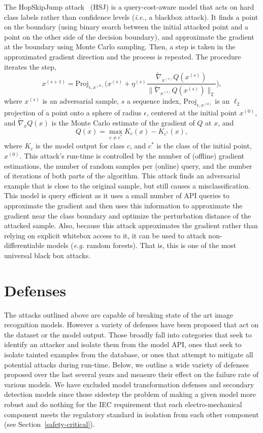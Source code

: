 \documentclass[lettersize,journal]{IEEEtran}
\newcommand{\ie}{\textit{i.e.}\xspace}
\newcommand{\eg}{\textit{e.g.}\xspace}
\begin{document}
The HopSkipJump attack~\cite{hopskipjump} (HSJ) is a query-cost-aware model that acts on hard class labels rather than confidence levels (\ie, a blackbox attack). It finds a point on the boundary (using binary search between the initial attacked point and a point on the other side of the decision boundary), and approximate the gradient at the boundary using Monte Carlo sampling. Then, a step is taken in the approximated gradient direction and the process is repeated. The procedure iterates the step,
$$
   x^{(s+1)} = \mathrm{Proj}_{\epsilon,x^{(0)}}\Bigg( x^{(s)} + \eta^{(s)} \frac{\widetilde{\nabla}_{x^{(s)}}  Q(x^{(s)}) }{\big\|\widetilde{\nabla}_{x^{(s)}} Q(x^{(s)}) \big\|_2}\Bigg),
$$
where $x^{(s)}$ is an adversarial sample, $s$ a sequence index, $\mathrm{Proj}_{\epsilon,x^{(0)}}$ is an $\ell_2$ projection of a point onto a sphere of radius $\epsilon$, centered at the initial point $x^{(0)}$, and $\widetilde{\nabla}_xQ(x)$ is the Monte Carlo estimate of the gradient of $Q$ at $x$, and
$$
    Q(x) = \max_{c\neq c^*} K_c(x) - K_{c^*}(x),
$$
where $K_{c}$ is the model output for class $c$, and $c^*$ is the class of the initial point, $x^{(0)}$. This attack's run-time is controlled by the number of (offline) gradient estimations, the number of random samples per (online) query, and the number of iterations of both parts of the algorithm. This attack finds an adversarial example that is close to the original sample, but still causes a misclassification.  This model is query efficient as it uses a small number of API queries to approximate the gradient and then uses this information to approximate the gradient near the class boundary and optimize the perturbation distance of the attacked sample. Also, because this attack approximates the gradient rather than relying on explicit whitebox access to it, it can be used to attack non-differentiable models (\eg random forests). That is, this is one of the most universal black box attacks.

\section{Defenses}
\label{defenses}

The attacks outlined above are capable of breaking state of the art image recognition models.  However a variety of defenses have been proposed that act on the dataset or the model output. Those broadly fall into categories that seek to identify an attacker and isolate them from the model API, ones that seek to isolate tainted examples from the database, or ones that attempt to mitigate all potential attacks during run-time. Below, we outline a wide variety of defenses proposed over the last several years and measure their effect on the failure rate of various models. We have excluded model transformation defenses and secondary detection models since those sidestep the problem of making a given model more robust and do nothing for the IEC requirement that each electro-mechanical component meets the regulatory standard in isolation from each other component (see Section~\ref{safety-critical}).
\end{document}
